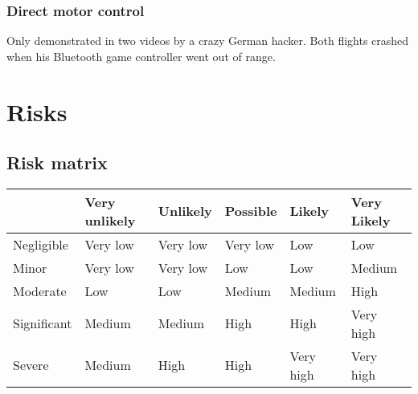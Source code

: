 \documentclass[a4paper, 11pt, titlepage]{article}
\begin{document}
\subsubsection{Direct motor control}
Only demonstrated in two videos by a crazy German hacker. Both flights crashed when his Bluetooth game controller went out of range.

\section{Risks}
\subsection{Risk matrix}
\begin{table}[H]
	\centering
	\begin{tabular}{|l|l|l|l|l|l|}
		\hline
		&  Very unlikely & Unlikely & Possible & Likely & Very Likely \\
		\hline
		Negligible & \cellcolor{vlowrisk} Very low & \cellcolor{vlowrisk} Very low & \cellcolor{vlowrisk} Very low & \cellcolor{lowrisk} Low & \cellcolor{lowrisk} Low \\ \hline
		Minor & \cellcolor{vlowrisk} Very low & \cellcolor{vlowrisk} Very low & \cellcolor{lowrisk} Low & \cellcolor{lowrisk} Low & \cellcolor{mediumrisk} Medium \\ \hline
		Moderate & \cellcolor{lowrisk} Low & \cellcolor{lowrisk} Low & \cellcolor{mediumrisk} Medium & \cellcolor{mediumrisk} Medium & \cellcolor{highrisk} High \\ \hline
		Significant & \cellcolor{mediumrisk} Medium & \cellcolor{mediumrisk} Medium & \cellcolor{highrisk} High & \cellcolor{highrisk} High & \cellcolor{veryhighrisk} Very high \\ \hline
		Severe & \cellcolor{mediumrisk} Medium & \cellcolor{highrisk} High & \cellcolor{highrisk} High & \cellcolor{veryhighrisk}Very high & \cellcolor{veryhighrisk}Very high \\ \hline
	\end{tabular}
\end{table}
\end{document}
